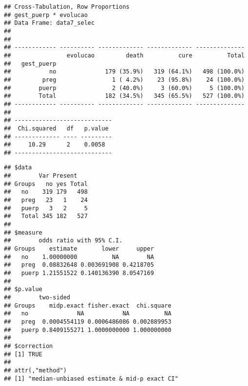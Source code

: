 \documentclass[
]{article}
\newenvironment{Shaded}{\begin{snugshade}}{\end{snugshade}}
\newcommand{\DataTypeTok}[1]{\textcolor[rgb]{0.13,0.29,0.53}{#1}}
\newcommand{\KeywordTok}[1]{\textcolor[rgb]{0.13,0.29,0.53}{\textbf{#1}}}
\newcommand{\NormalTok}[1]{#1}
\newcommand{\OperatorTok}[1]{\textcolor[rgb]{0.81,0.36,0.00}{\textbf{#1}}}
\newcommand{\OtherTok}[1]{\textcolor[rgb]{0.56,0.35,0.01}{#1}}
\newcommand{\StringTok}[1]{\textcolor[rgb]{0.31,0.60,0.02}{#1}}
\begin{document}
\begin{Shaded}
\end{Shaded}

\begin{verbatim}
## Cross-Tabulation, Row Proportions  
## gest_puerp * evolucao  
## Data Frame: data7_selec  
## 
## 
## ------------ ---------- ------------- ------------- --------------
##                evolucao         death          cure          Total
##   gest_puerp                                                      
##           no              179 (35.9%)   319 (64.1%)   498 (100.0%)
##         preg                1 ( 4.2%)    23 (95.8%)    24 (100.0%)
##        puerp                2 (40.0%)     3 (60.0%)     5 (100.0%)
##        Total              182 (34.5%)   345 (65.5%)   527 (100.0%)
## ------------ ---------- ------------- ------------- --------------
## 
## ----------------------------
##  Chi.squared   df   p.value 
## ------------- ---- ---------
##     10.29      2    0.0058  
## ----------------------------
\end{verbatim}

\begin{Shaded}
\end{Shaded}

\begin{verbatim}
## $data
##        Var Present
## Groups   no yes Total
##   no    319 179   498
##   preg   23   1    24
##   puerp   3   2     5
##   Total 345 182   527
## 
## $measure
##        odds ratio with 95% C.I.
## Groups    estimate       lower     upper
##   no    1.00000000          NA        NA
##   preg  0.08832648 0.003691908 0.4218705
##   puerp 1.21551522 0.140136390 8.0547169
## 
## $p.value
##        two-sided
## Groups    midp.exact fisher.exact  chi.square
##   no              NA           NA          NA
##   preg  0.0004554119 0.0006486086 0.002889953
##   puerp 0.8409155271 1.0000000000 1.000000000
## 
## $correction
## [1] TRUE
## 
## attr(,"method")
## [1] "median-unbiased estimate & mid-p exact CI"
\end{verbatim}
\end{document}
